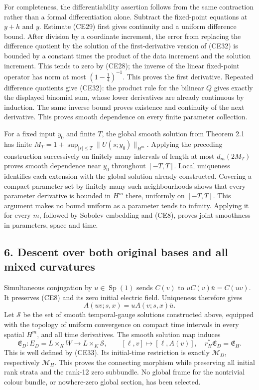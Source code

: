 \documentclass[11pt]{article}
\begin{document}
For completeness, the differentiability assertion follows from the
same contraction rather than a formal differentiation alone.
Subtract the fixed-point equations at \(y+h\) and \(y\).
Estimate (CE29) first gives continuity and a uniform difference bound.
After division by a coordinate increment, the error from replacing
the difference quotient by the solution of the first-derivative version
of (CE32) is bounded by a constant times the product of the data
increment and the solution increment. This tends to zero by (CE28);
the inverse of the linear fixed-point operator has norm at most
\((1-\tfrac14)^{-1}\). This proves the first derivative.
Repeated difference quotients give (CE32): the product rule for the
bilinear \(Q\) gives exactly the displayed binomial sum, whose lower
derivatives are already continuous by induction. The same inverse
bound proves existence and continuity of the next derivative.
This proves smooth dependence on every finite parameter collection.

For a fixed input \(y_0\) and finite \(T\), the global smooth solution
from Theorem 2.1 has finite
\(M_T=1+\sup_{|s|\leq T}\|U(s;y_0)\|_{H^m}\).
Applying the preceding construction successively on finitely many
intervals of length at most \(d_m(2M_T)\) proves smooth dependence
near \(y_0\) throughout \([-T,T]\). Local uniqueness identifies each
extension with the global solution already constructed.
Covering a compact parameter set by finitely many such neighbourhoods
shows that every parameter derivative is bounded in \(H^m\) there,
uniformly on \([-T,T]\). This argument makes no bound uniform as a
parameter tends to infinity. Applying it for every \(m\), followed by
Sobolev embedding and (CE8), proves joint smoothness in parameters,
space and time.

\subsection*{6. Descent over both original bases and all mixed curvatures}

Simultaneous conjugation by \(u\in\operatorname{Sp}(1)\) sends
\(C(v)\) to \(uC(v)\bar u=C(uv)\). It preserves (CE8) and its zero
initial electric field. Uniqueness therefore gives
\[
 A(uv;s,x)=uA(v;s,x)\bar u.
 \tag{CE33}
\]
Let \(\mathscr S\) be the set of smooth temporal-gauge solutions
constructed above, equipped with the topology of uniform convergence
on compact time intervals in every spatial \(H^m\), and all time
derivatives. The smooth solution map induces
\[
 \mathfrak E_D:E_D=L\times_K W\longrightarrow L\times_K\mathscr S,
 \qquad [\ell,v]\longmapsto[\ell,A(v)],
 \quad
 r_H^*\mathfrak E_D=\mathfrak E_H.
 \tag{CE34}
\]
This is well defined by (CE33). Its initial-time restriction is exactly
\(\mathcal M_D\), respectively \(\mathcal M_H\). This proves the
connecting morphism while preserving all initial rank strata and the
rank-12 zero subbundle. No global frame for the nontrivial colour
bundle, or nowhere-zero global section, has been selected.
\end{document}
